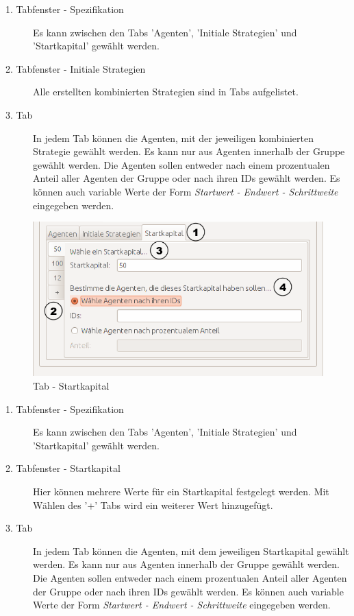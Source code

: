 \begin{description}

\item[1. Tabfenster - Spezifikation] Es kann zwischen den Tabs 'Agenten', 'Initiale Strategien' und 'Startkapital' gewählt werden.  

\item[2. Tabfenster - Initiale Strategien] Alle erstellten kombinierten Strategien sind in Tabs aufgelistet. 

\item[3. Tab] In jedem Tab können die Agenten, mit der jeweiligen kombinierten Strategie gewählt werden. Es kann nur aus Agenten innerhalb der Gruppe gewählt werden. Die Agenten sollen entweder nach einem prozentualen Anteil aller Agenten der Gruppe oder nach ihren IDs gewählt werden. Es können auch variable Werte der Form \textit{Startwert - Endwert - Schrittweite} eingegeben werden.

\end{description}


\begin{figure}[H] 
  \centering
     \includegraphics[width=1.0\textwidth]{GUI_Entwurf/InitialisierungBearbeiten3.png}
  \caption{Tab - Startkapital}
  \label{fig:Bild1}
\end{figure}

\begin{description}

\item[1. Tabfenster - Spezifikation] Es kann zwischen den Tabs 'Agenten', 'Initiale Strategien' und 'Startkapital' gewählt werden.  

\item[2. Tabfenster - Startkapital] Hier können mehrere Werte für ein Startkapital festgelegt werden. Mit Wählen des '+' Tabs wird ein weiterer Wert hinzugefügt.

\item[3. Tab] In jedem Tab können die Agenten, mit dem jeweiligen Startkapital gewählt werden. Es kann nur aus Agenten innerhalb der Gruppe gewählt werden. Die Agenten sollen entweder nach einem prozentualen Anteil aller Agenten der Gruppe oder nach ihren IDs gewählt werden. Es können auch variable Werte der Form \textit{Startwert - Endwert - Schrittweite} eingegeben werden.

\end{description}

